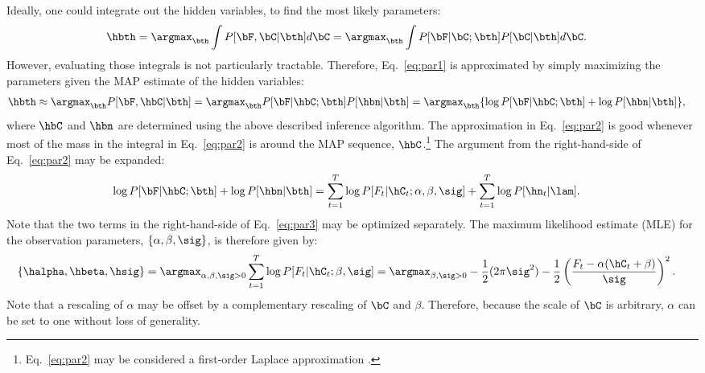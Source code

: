 Ideally, one could integrate out the hidden variables, to find the most likely parameters:
\begin{align} \label{eq:par1}
\hbth &= \argmax_{\bth} \int P[\bF, \bC | \bth] d\bC  = \argmax_{\bth} \int P[\bF | \bC; \bth] P[\bC | \bth] d\bC.
\end{align}
However, evaluating those integrals is not particularly tractable.
Therefore, Eq.~\eqref{eq:par1} is approximated by simply maximizing the parameters given the MAP estimate of the hidden variables:
\begin{align} \label{eq:par2}
\hbth &\approx \argmax_{\bth} P[\bF, \hbC | \bth] = \argmax_{\bth} P[\bF| \hbC; \bth] P[\hbn | \bth] = \argmax_{\bth} \{ \log P[\bF | \hbC; \bth] + \log P[\hbn | \bth] \}, 
\end{align}
\noindent where $\hbC$ and $\hbn$ are determined using the above described inference algorithm. The approximation in Eq.~\eqref{eq:par2} is good whenever most of the mass in the integral in Eq.~\eqref{eq:par2} is around the MAP sequence, $\hbC$.\footnote{Eq.~\eqref{eq:par2} may be considered a first-order Laplace approximation \cite{KassRaftery95}.}  The argument from the right-hand-side of Eq.~\eqref{eq:par2} may be expanded: 
\begin{align} \label{eq:par3}
\log P[\bF| \hbC; \bth] + \log P[\hbn | \bth] &= \sum_{t=1}^T \log P[F_t | \hC_t; \alpha, \beta,\sig] + \sum_{t=1}^T \log P[\hn_t | \lam].
\end{align}
\noindent Note that the two terms in the right-hand-side of Eq.~\eqref{eq:par3} may be optimized separately.  The maximum likelihood estimate (MLE) for the observation parameters, $\{\alpha,\beta,\sig\}$, is therefore given by:
\begin{align} \label{eq:beta,sig}
	\{\halpha, \hbeta,\hsig\} &=  \argmax_{\alpha, \beta,\sig >0} \sum_{t=1}^T \log P[F_t | \hC_t; \beta,\sig]
	=  \argmax_{\beta,\sig >0} 	-\frac{1}{2} (2\pi \sig^2) - \frac{1}{2} \left(\frac{F_t-\alpha(\hC_t+\beta)}{\sig}\right)^2. %
\end{align}
Note that a rescaling of $\alpha$ may be offset by a complementary rescaling of $\bC$ and $\beta$.  Therefore, because the scale of $\bC$ is arbitrary, $\alpha$ can be set to one without loss of generality.  
